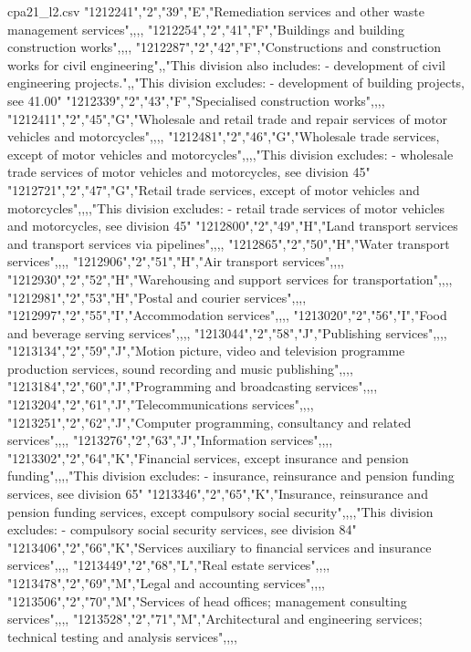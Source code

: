 \begin{filecontents*}{cpa21_l2.csv}
"1212241","2","39","E","Remediation services and other waste management services",,,,
"1212254","2","41","F","Buildings and building construction works",,,,
"1212287","2","42","F","Constructions and construction works for civil engineering",,"This division also includes:
- development of civil engineering projects.",,"This division excludes:
- development of building projects, see 41.00"
"1212339","2","43","F","Specialised construction works",,,,
"1212411","2","45","G","Wholesale and retail trade and repair services of motor vehicles and motorcycles",,,,
"1212481","2","46","G","Wholesale trade services, except of motor vehicles and motorcycles",,,,"This division excludes:
- wholesale trade services of motor vehicles and motorcycles, see division 45"
"1212721","2","47","G","Retail trade services, except of motor vehicles and motorcycles",,,,"This division excludes:
- retail trade services of motor vehicles and motorcycles, see division 45"
"1212800","2","49","H","Land transport services and transport services via pipelines",,,,
"1212865","2","50","H","Water transport services",,,,
"1212906","2","51","H","Air transport services",,,,
"1212930","2","52","H","Warehousing and support services for transportation",,,,
"1212981","2","53","H","Postal and courier services",,,,
"1212997","2","55","I","Accommodation services",,,,
"1213020","2","56","I","Food and beverage serving services",,,,
"1213044","2","58","J","Publishing services",,,,
"1213134","2","59","J","Motion picture, video and television programme production services, sound recording and music publishing",,,,
"1213184","2","60","J","Programming and broadcasting services",,,,
"1213204","2","61","J","Telecommunications services",,,,
"1213251","2","62","J","Computer programming, consultancy and related services",,,,
"1213276","2","63","J","Information services",,,,
"1213302","2","64","K","Financial services, except insurance and pension funding",,,,"This division excludes:
- insurance, reinsurance and pension funding services, see division 65"
"1213346","2","65","K","Insurance, reinsurance and pension funding services, except compulsory social security",,,,"This division excludes:
- compulsory social security services, see division 84"
"1213406","2","66","K","Services auxiliary to financial services and insurance services",,,,
"1213449","2","68","L","Real estate services",,,,
"1213478","2","69","M","Legal and accounting services",,,,
"1213506","2","70","M","Services of head offices; management consulting services",,,,
"1213528","2","71","M","Architectural and engineering services; technical testing and analysis services",,,,

\end{filecontents*}
